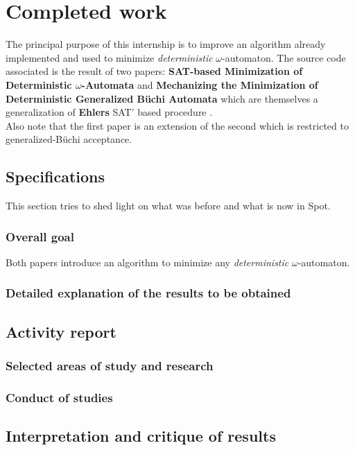 \chapter{Completed work}
The principal purpose of this internship is to improve an algorithm already implemented and used to
minimize \textit{deterministic} $\omega$-automaton. The source code associated is the result of two papers:
\textbf{SAT-based Minimization of Deterministic $\omega$-Automata}\cite{15} and
\textbf{Mechanizing the Minimization of Deterministic Generalized Büchi Automata}\cite{14} which are
themselves a generalization of \textbf{Ehlers} SAT' based procedure \cite{17}.\\

Also note that the first paper is an extension of the second which is restricted to generalized-Büchi
acceptance.

\section{Specifications}
This section tries to shed light on what was before and what is now in Spot.

\subsection{Overall goal}
Both papers introduce an algorithm to minimize any \textit{deterministic} $\omega$-automaton.

\subsection{Detailed explanation of the results to be obtained}

\section{Activity report}
\subsection{Selected areas of study and research}
\subsection{Conduct of studies}
\section{Interpretation and critique of results}